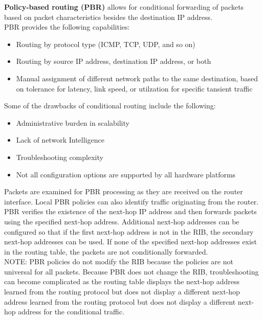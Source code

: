 \documentclass{article}
\begin{document}
\begin{itemize}
	\textbf{Policy-based routing (PBR)} allows for conditional forwarding of packets based on packet characteristics besides the destination IP address.\\

	PBR provides the following capabilities:
	\begin{itemize}
		\item Routing by protocol type (ICMP, TCP, UDP, and so on)
		\item Routing by source IP address, destination IP address, or both
		\item Manual assignment of different network paths to the same destination, based on tolerance for latency, link speed, or utilzation for specific tansient traffic
	\end{itemize}

	Some of the drawbacks of conditional routing include the following:
	\begin{itemize}
		\item Administrative burden in scalability
		\item Lack of network Intelligence
		\item Troubleshooting complexity
		\item Not all configuration options are supported by all hardware platforms
	\end{itemize}

	Packets are examined for PBR processing as they are received on the router interface. Local PBR policies can also identify traffic originating from the router.\\

	PBR verifies the existence of the next-hop IP address and then forwards packets using the specified next-hop address. Additional next-hop addresses can be configured so that if the first next-hop address is not in the RIB, the secondary next-hop addresses can be used. If none of the specified next-hop addresses exist in the routing table, the packets are not conditionally forwarded.\\

	NOTE: PBR policies do not modify the RIB because the policies are not universal for all packets. Because PBR does not change the RIB, troubleshooting can become complicated as the routing table displays the next-hop address learned from the routing protocol but does not display a different next-hop address learned from the routing protocol but does not display a different next-hop address for the conditional traffic.\\


\end{itemize}
\end{document}
